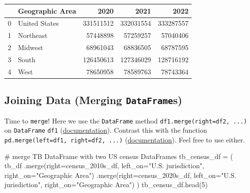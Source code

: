 \documentclass[
  letterpaper,
  DIV=11,
  numbers=noendperiod]{scrreprt}
\newenvironment{Shaded}{\begin{snugshade}}{\end{snugshade}}
\newcommand{\CommentTok}[1]{\textcolor[rgb]{0.37,0.37,0.37}{#1}}
\newcommand{\DecValTok}[1]{\textcolor[rgb]{0.68,0.00,0.00}{#1}}
\newcommand{\NormalTok}[1]{\textcolor[rgb]{0.00,0.23,0.31}{#1}}
\newcommand{\OperatorTok}[1]{\textcolor[rgb]{0.37,0.37,0.37}{#1}}
\newcommand{\StringTok}[1]{\textcolor[rgb]{0.13,0.47,0.30}{#1}}
\begin{document}
\begin{tabular}{llrrr}
\toprule
{} & Geographic Area &       2020 &       2021 &       2022 \\
\midrule
0 &   United States &  331511512 &  332031554 &  333287557 \\
1 &       Northeast &   57448898 &   57259257 &   57040406 \\
2 &         Midwest &   68961043 &   68836505 &   68787595 \\
3 &           South &  126450613 &  127346029 &  128716192 \\
4 &            West &   78650958 &   78589763 &   78743364 \\
\bottomrule
\end{tabular}

\hypertarget{joining-data-merging-dataframes}{%
\subsection{\texorpdfstring{Joining Data (Merging
\texttt{DataFrame}s)}{Joining Data (Merging DataFrames)}}\label{joining-data-merging-dataframes}}

Time to \texttt{merge}! Here we use the \texttt{DataFrame} method
\texttt{df1.merge(right=df2,\ ...)} on \texttt{DataFrame} \texttt{df1}
(\href{https://pandas.pydata.org/docs/reference/api/pandas.DataFrame.merge.html}{documentation}).
Contrast this with the function
\texttt{pd.merge(left=df1,\ right=df2,\ ...)}
(\href{https://pandas.pydata.org/docs/reference/api/pandas.merge.html?highlight=pandas\%20merge\#pandas.merge}{documentation}).
Feel free to use either.

\begin{Shaded}
\begin{Highlighting}[]
\CommentTok{\# merge TB DataFrame with two US census DataFrames}
\NormalTok{tb\_census\_df }\OperatorTok{=}\NormalTok{ (}
\NormalTok{    tb\_df}
\NormalTok{    .merge(right}\OperatorTok{=}\NormalTok{census\_2010s\_df,}
\NormalTok{           left\_on}\OperatorTok{=}\StringTok{"U.S. jurisdiction"}\NormalTok{, right\_on}\OperatorTok{=}\StringTok{"Geographic Area"}\NormalTok{)}
\NormalTok{    .merge(right}\OperatorTok{=}\NormalTok{census\_2020s\_df,}
\NormalTok{           left\_on}\OperatorTok{=}\StringTok{"U.S. jurisdiction"}\NormalTok{, right\_on}\OperatorTok{=}\StringTok{"Geographic Area"}\NormalTok{)}
\NormalTok{)}
\NormalTok{tb\_census\_df.head(}\DecValTok{5}\NormalTok{)}
\end{Highlighting}
\end{Shaded}
\end{document}
